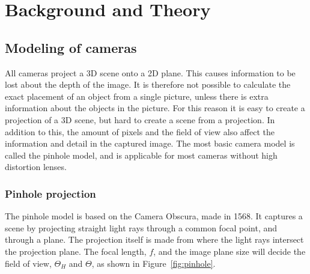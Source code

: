 
\chapter{Background and Theory}
\section{Modeling of cameras}

All cameras project a 3D scene onto a 2D plane. This causes information to be lost about the depth of the image. It is therefore not possible to calculate the exact placement of an object from a single picture, unless there is extra information about the objects in the picture. For this reason it is easy to create a projection of a 3D scene, but hard to create a scene from a projection. In addition to this, the amount of pixels and the field of view also affect the information and detail in the captured image. The most basic camera model is called the pinhole model, and is applicable for most cameras without high distortion lenses.

\subsection{Pinhole projection} \label{sec:pinhole}
The pinhole model is based on the Camera Obscura, made in 1568. It captures a scene by projecting straight light rays through a common focal point, and through a plane. The projection itself is made from where the light rays intersect the projection plane. The focal length, $f$, and the image plane size will decide the field of view, $\Theta_H$ and $\Theta$, as shown in Figure~\ref{fig:pinhole}. 

